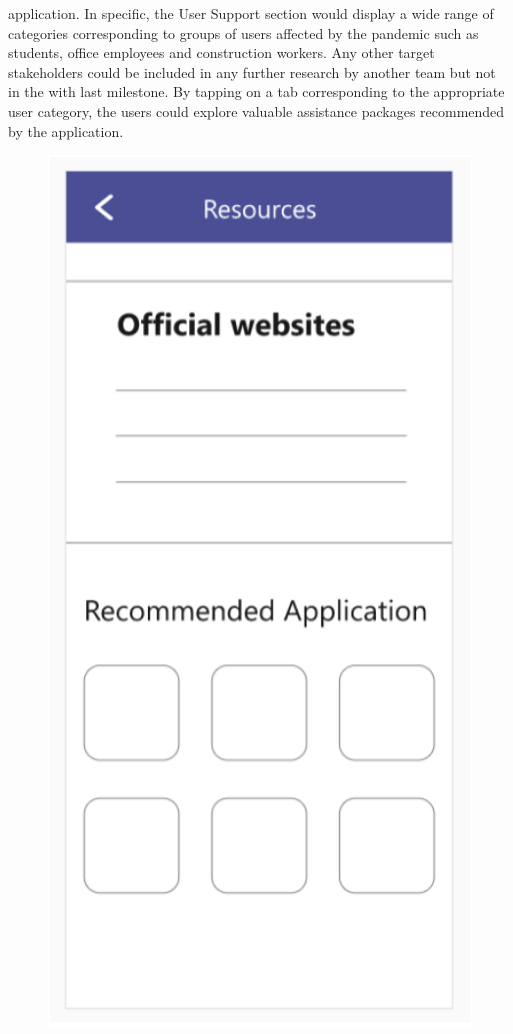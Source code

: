 \begin{enumerate}[a)]
          application. In specific, the User Support section would display a wide range of categories
          corresponding to groups of users affected by the pandemic such as students, office employees and
          construction workers. Any other target stakeholders could be included in any further research by
          another team but not in the with last milestone. By tapping on a tab corresponding to the appropriate
          user category, the users could explore valuable assistance packages recommended by the application.
          \begin{figure}[H]
            \centering
            \includegraphics[scale=1]{img/prototype/iter3-proto-7.png}

\end{figure}
\end{enumerate}
